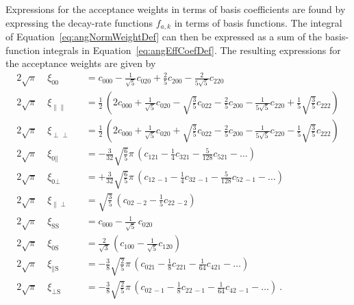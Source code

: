 Expressions for the acceptance weights in terms of basis coefficients are found by expressing the decay-rate functions $f_{a,k}$ in terms
of basis functions. The integral of Equation~\ref{eq:angNormWeightDef} can then be expressed as a sum of the basis-function integrals in
Equation~\ref{eq:angEffCoefDef}. The resulting expressions for the acceptance weights are given by
\begin{equation}
  \label{eq:angCoefToWeight}
  \begin{alignedat}{2}
    2\sqrt{\pi}\; &\xi_{\text{00}} &
      &= c_{000} - \tfrac{1}{\sqrt{5}} c_{020} + \tfrac{2}{5} c_{200} - \tfrac{2}{5\sqrt{5}} c_{220} \\
    2\sqrt{\pi}\; &\xi_{\parallel\parallel} &
      &= \tfrac{1}{2}\,(2 c_{000} + \tfrac{1}{\sqrt{5}} c_{020} - \sqrt{\tfrac{3}{5}} c_{022} - \tfrac{2}{5} c_{200}
         - \tfrac{1}{5\sqrt{5}} c_{220} + \tfrac{1}{5}\sqrt{\tfrac{3}{5}} c_{222}) \\
    2\sqrt{\pi}\; &\xi_{\perp\perp} &
      &= \tfrac{1}{2}\,(2 c_{000} + \tfrac{1}{\sqrt{5}} c_{020} + \sqrt{\tfrac{3}{5}} c_{022} - \tfrac{2}{5} c_{200}
         - \tfrac{1}{5\sqrt{5}} c_{220} - \tfrac{1}{5}\sqrt{\tfrac{3}{5}} c_{222}) \\
    2\sqrt{\pi}\; &\xi_{\text{0}\parallel} &
      &= -\tfrac{3}{32}\sqrt{\tfrac{6}{5}}\pi\, (c_{121} - \tfrac{1}{4} c_{321} - \tfrac{5}{128} c_{521} - \ldots) \\
    2\sqrt{\pi}\; &\xi_{\text{0}\perp} &
      &= +\tfrac{3}{32}\sqrt{\tfrac{6}{5}}\pi\, (c_{12\,-1} - \tfrac{1}{4} c_{32\,-1} - \tfrac{5}{128} c_{52\,-1} - \ldots) \\
    2\sqrt{\pi}\; &\xi_{\parallel\perp} &
      &= \sqrt{\tfrac{3}{5}}\, (c_{02\,-2} - \tfrac{1}{5} c_{22\,-2}) \\
    2\sqrt{\pi}\; &\xi_{\text{SS}} &
      &= c_{000} - \tfrac{1}{\sqrt{5}}\,c_{020} \\
    2\sqrt{\pi}\; &\xi_{\text{0S}} &
      &= \tfrac{2}{\sqrt{3}}\, (c_{100} - \tfrac{1}{\sqrt{5}} c_{120}) \\
    2\sqrt{\pi}\; &\xi_{\parallel\text{S}} &
      &= -\tfrac{3}{8}\sqrt{\tfrac{2}{5}}\pi\, (c_{021} - \tfrac{1}{8} c_{221} - \tfrac{1}{64} c_{421} - \ldots) \\
    2\sqrt{\pi}\; &\xi_{\perp\text{S}} &
      &= -\tfrac{3}{8}\sqrt{\tfrac{2}{5}}\pi\, (c_{02\,-1} - \tfrac{1}{8} c_{22\,-1} - \tfrac{1}{64} c_{42\,-1} - \ldots) \ .
  \end{alignedat}
\end{equation}

